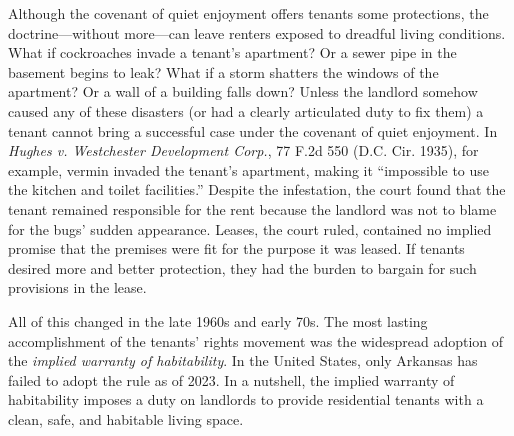 Although the covenant of quiet enjoyment offers tenants some protections, the
doctrine---without more---can leave renters exposed to dreadful living
conditions.  What if cockroaches invade a tenant's apartment? Or a sewer pipe
in the basement begins to leak?  What if a storm shatters the windows of the
apartment? Or a wall of a building falls down?  Unless the landlord somehow
caused any of these disasters (or had a clearly articulated duty to fix them) a
tenant cannot bring a successful case under the covenant of quiet enjoyment. 
In \textit{Hughes v. Westchester Development Corp.}, 77 F.2d 550 (D.C. Cir.
1935), for example, vermin invaded the tenant's apartment, making it
``impossible to use the kitchen and toilet facilities.'' Despite the
infestation, the court found that the tenant remained responsible for the rent
because the landlord was not to blame for the bugs' sudden appearance.  Leases,
the court ruled, contained no implied promise that the premises were fit for the
purpose it was leased.  If tenants desired more and better protection, they had
the burden to bargain for such provisions in the lease. 

All of this changed in the late 1960s and early 70s.  The most lasting
accomplishment of the tenants' rights movement was the widespread adoption of
the \textit{implied warranty of habitability}. In the United States, only
Arkansas has failed to adopt the rule as of 2023.  In a nutshell, the implied
warranty of
habitability imposes a duty on landlords to provide residential tenants with a
clean, safe, and habitable living space. 

